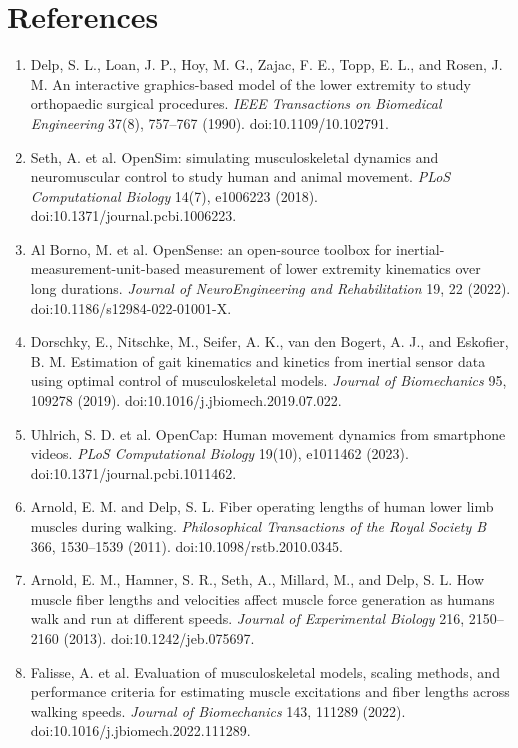 \documentclass[11pt]{article}
\begin{document}
\section*{References}

\begin{enumerate}
\item Delp, S. L., Loan, J. P., Hoy, M. G., Zajac, F. E., Topp, E. L., and Rosen, J. M. An interactive graphics-based model of the lower extremity to study orthopaedic surgical procedures. \textit{IEEE Transactions on Biomedical Engineering} 37(8), 757--767 (1990). doi:10.1109/10.102791.
\item Seth, A. et al. OpenSim: simulating musculoskeletal dynamics and neuromuscular control to study human and animal movement. \textit{PLoS Computational Biology} 14(7), e1006223 (2018). doi:10.1371/journal.pcbi.1006223.
\item Al Borno, M. et al. OpenSense: an open-source toolbox for inertial-measurement-unit-based measurement of lower extremity kinematics over long durations. \textit{Journal of NeuroEngineering and Rehabilitation} 19, 22 (2022). doi:10.1186/s12984-022-01001-X.
\item Dorschky, E., Nitschke, M., Seifer, A. K., van den Bogert, A. J., and Eskofier, B. M. Estimation of gait kinematics and kinetics from inertial sensor data using optimal control of musculoskeletal models. \textit{Journal of Biomechanics} 95, 109278 (2019). doi:10.1016/j.jbiomech.2019.07.022.
\item Uhlrich, S. D. et al. OpenCap: Human movement dynamics from smartphone videos. \textit{PLoS Computational Biology} 19(10), e1011462 (2023). doi:10.1371/journal.pcbi.1011462.
\item Arnold, E. M. and Delp, S. L. Fiber operating lengths of human lower limb muscles during walking. \textit{Philosophical Transactions of the Royal Society B} 366, 1530--1539 (2011). doi:10.1098/rstb.2010.0345.
\item Arnold, E. M., Hamner, S. R., Seth, A., Millard, M., and Delp, S. L. How muscle fiber lengths and velocities affect muscle force generation as humans walk and run at different speeds. \textit{Journal of Experimental Biology} 216, 2150--2160 (2013). doi:10.1242/jeb.075697.
\item Falisse, A. et al. Evaluation of musculoskeletal models, scaling methods, and performance criteria for estimating muscle excitations and fiber lengths across walking speeds. \textit{Journal of Biomechanics} 143, 111289 (2022). doi:10.1016/j.jbiomech.2022.111289.

\end{enumerate}
\end{document}
